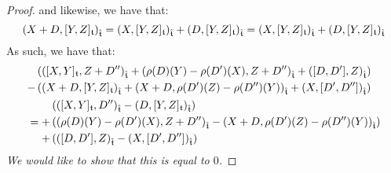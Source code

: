\begin{proof}
                and likewise, we have that:
                    $$\left( X + D, [Y, Z]_{\mathfrak{t}} \right)_{\hat{\mathfrak{t}}} = (X, [Y, Z]_{\mathfrak{t}})_{\hat{\mathfrak{t}}} + (D, [Y, Z]_{\mathfrak{t}})_{\hat{\mathfrak{t}}} = (X, [Y, Z]_{\mathfrak{t}})_{\hat{\mathfrak{t}}} + (D, [Y, Z]_{\mathfrak{t}})_{\hat{\mathfrak{t}}}$$
                As such, we have that:
                    $$
                        \begin{aligned}
                            & 
                            \begin{aligned}
                                & \left( \left( [X, Y]_{\mathfrak{t}}, Z + D'' \right)_{\hat{\mathfrak{t}}} + \left(\rho(D)(Y) - \rho(D')(X), Z + D'' \right)_{\hat{\mathfrak{t}}} + \left( [D, D'], Z \right)_{\hat{\mathfrak{t}}} \right)
                                \\
                                - & \left( \left( X + D, [Y, Z]_{\mathfrak{t}} \right)_{\hat{\mathfrak{t}}} + \left( X + D, \rho(D')(Z) - \rho(D'')(Y) \right)_{\hat{\mathfrak{t}}} + \left(X, [D', D'']\right)_{\hat{\mathfrak{t}}} \right)
                            \end{aligned}
                            \\
                            & =
                            \begin{aligned}
                                & \left( ( [X, Y]_{\mathfrak{t}}, D'')_{\hat{\mathfrak{t}}} - (D, [Y, Z]_{\mathfrak{t}})_{\hat{\mathfrak{t}}} \right)
                                \\
                                + & \left( \left(\rho(D)(Y) - \rho(D')(X), Z + D'' \right)_{\hat{\mathfrak{t}}} - \left( X + D, \rho(D')(Z) - \rho(D'')(Y) \right)_{\hat{\mathfrak{t}}} \right)
                                \\
                                + & \left( \left( [D, D'], Z \right)_{\hat{\mathfrak{t}}} - \left(X, [D', D'']\right)_{\hat{\mathfrak{t}}} \right)
                            \end{aligned}
                        \end{aligned}
                    $$
                \textit{We would like to show that this is equal to $0$.}


\end{proof}
